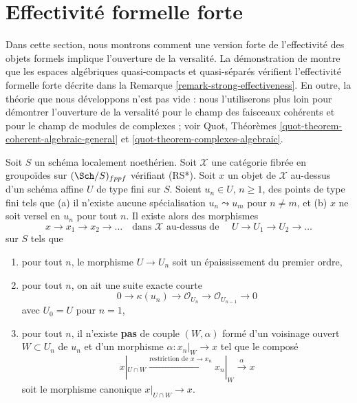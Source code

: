 \section{Effectivité formelle forte}
\label{section-strong-formal-effectiveness}

\noindent
Dans cette section, nous montrons comment une version forte de l'effectivité
des objets formels implique l'ouverture de la versalité. La démonstration de
\cite[théorème 1.1]{Bhatt-Algebraize} montre que les espaces algébriques quasi-compacts et
quasi-séparés vérifient l'effectivité formelle forte
décrite dans la Remarque \ref{remark-strong-effectiveness}. En outre, la
théorie que nous développons n'est pas vide : nous l'utiliserons plus loin pour démontrer l'ouverture de la versalité
pour le champ des faisceaux cohérents et pour le champ de modules de complexes ; voir
Quot, Théorèmes
\ref{quot-theorem-coherent-algebraic-general} et
\ref{quot-theorem-complexes-algebraic}.

\begin{lemma}
\label{lemma-infinite-sequence-pre}
Soit $S$ un schéma localement noethérien. Soit $\mathcal{X}$ une catégorie
fibrée en groupoïdes sur $(\Sch/S)_{fppf}$ vérifiant (RS*).
Soit $x$ un objet de
$\mathcal{X}$ au-dessus d'un schéma affine $U$ de type fini sur $S$.
Soient $u_n \in U$, $n \geq 1$, des points de type fini tels que
(a) il n'existe aucune spécialisation $u_n \leadsto u_m$ pour $n \not = m$, et
(b) $x$ ne soit versel en $u_n$ pour tout $n$. Il existe alors des morphismes
$$
x \to x_1 \to x_2 \to \ldots
\quad\text{dans }\mathcal{X}\text{ au-dessus de }\quad
U \to U_1 \to U_2 \to \ldots
$$
sur $S$ tels que
\begin{enumerate}
\item pour tout $n$, le morphisme $U \to U_n$ soit un épaississement du premier
ordre,
\item pour tout $n$, on ait une suite exacte courte
$$
0 \to \kappa(u_n) \to \mathcal{O}_{U_n} \to \mathcal{O}_{U_{n - 1}} \to 0
$$
avec $U_0 = U$ pour $n = 1$,
\item pour tout $n$, il n'existe {\bf pas} de couple $(W, \alpha)$
formé d'un voisinage ouvert $W \subset U_n$ de $u_n$
et d'un morphisme $\alpha : x_n|_W \to x$
tel que le composé
$$
x|_{U \cap W} \xrightarrow{\text{restriction de }x \to x_n}
x_n|_W \xrightarrow{\alpha} x
$$
soit le morphisme canonique $x|_{U \cap W} \to x$.
\end{enumerate}
\end{lemma}

